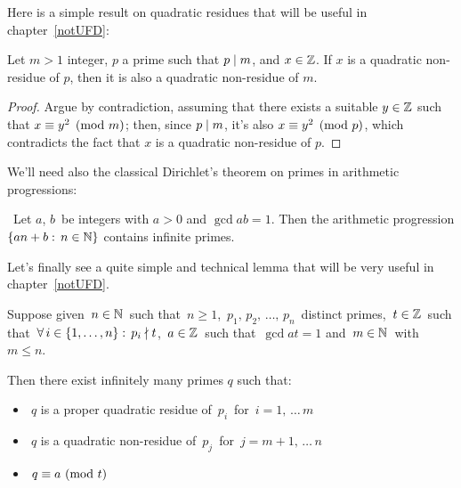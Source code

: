 \smallskip

Here is a simple result on quadratic residues that will be useful
in chapter~\ref{notUFD}:
\begin{lem}\label{helper_lem_on_quadratic_residues}
Let $m > 1$ integer, $p$ a prime such that $p \mid m$, and $x \in \mathbb{Z}$.
If $x$ is a quadratic non-residue of $p$, then it is also a quadratic
non-residue of $m$.
\end{lem}
\begin{proof}
Argue by contradiction, assuming that there exists a suitable $y \in \mathbb{Z}$
such that \mbox{$x \equiv y^2 \pmod m$}; then, since $p \mid m$,
it's also \mbox{$x \equiv y^2 \pmod p$}, which contradicts the fact
that $x$ is a quadratic non-residue of $p$.
\end{proof}

\medskip

We'll need also the classical Dirichlet's theorem on primes in
arithmetic progressions:

\begin{thmen}
~Let\/ $a$, $b$\, be integers with\/ $a>0$\/ and\/ $\gcd{a}{b} = 1$.
Then the arithmetic progression $\left\{a n + b : \, n\in\mathbb{N}\right\}$
contains infinite primes.
\end{thmen}

Let's finally see a quite simple and technical lemma that will
be very useful in chapter~\ref{notUFD}.

\begin{lem}\label{basic_technical_lem}
Suppose given\, $n \in \mathbb{N}$\, such that \,$n \geq 1$,\,
$ p_1,\, p_2,\, \ldots,\, p_n$\, distinct primes,\,
$t \in \mathbb{Z}$\, such that\, $\forall\, i \in
\{1, \ldots, n\}:\, p_i \nmid t$,\, $a \in \mathbb{Z}$\, such that\,
$\gcd{a}{t} = 1$ and\, $m \in \mathbb{N}$\, with\, $m \leq n$.

Then there exist infinitely many primes $q$ such that:

\begin{itemize}
\item $\:q$ is a proper quadratic residue of\, $p_i$\, for\,
      $i = 1,\, \ldots\, m$
\item $\:q$ is a quadratic non-residue of\, $p_j$\, for\,
      $j = m + 1,\, \ldots\, n$
\item $\:q \equiv a\ \mathrm{(mod\ } t \mathrm{)}$
\end{itemize}

%
\end{lem}

